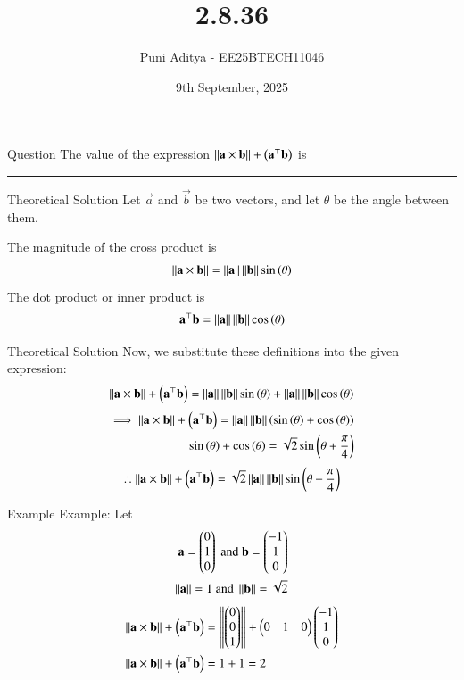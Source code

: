\documentclass{beamer}
\title{2.8.36}
\date{9th September, 2025}
\author{Puni Aditya - EE25BTECH11046}
\begin{document}
\frame{\titlepage}
\begin{frame}{Question}
The value of the expression $\left\lVert\mathbf{a} \times \mathbf{b}\right\rVert + \left(\mathbf{a}^\top\mathbf{b}\right)$ is \rule{2cm}{0.4pt}
\end{frame}

\begin{frame}{Theoretical Solution}
Let $\vec{a}$ and $\vec{b}$ be two vectors, and let $\theta$ be the angle between them.

The magnitude of the cross product is
\begin{align}
    \left\lVert\mathbf{a} \times \mathbf{b}\right\rVert = \left\lVert\mathbf{a}\right\rVert \left\lVert\mathbf{b}\right\rVert \sin\left(\theta\right)
\end{align}
The dot product or inner product is
\begin{align}
    \mathbf{a}^\top\mathbf{b} = \left\lVert\mathbf{a}\right\rVert \left\lVert\mathbf{b}\right\rVert \cos\left(\theta\right)
\end{align}
\end{frame}

\begin{frame}{Theoretical Solution}
Now, we substitute these definitions into the given expression:
\begin{align}
    \left\lVert\mathbf{a} \times \mathbf{b}\right\rVert + \left(\mathbf{a}^\top\mathbf{b}\right) = \left\lVert\mathbf{a}\right\rVert \left\lVert\mathbf{b}\right\rVert \sin\left(\theta\right) + \left\lVert\mathbf{a}\right\rVert \left\lVert\mathbf{b}\right\rVert \cos\left(\theta\right)
\end{align}
\begin{align}
\implies \left\lVert\mathbf{a} \times \mathbf{b}\right\rVert + \left(\mathbf{a}^\top\mathbf{b}\right) = \left\lVert\mathbf{a}\right\rVert \left\lVert\mathbf{b}\right\rVert \left(\sin\left(\theta\right) + \cos\left(\theta\right)\right) \\
\sin\left(\theta\right) + \cos\left(\theta\right) = \sqrt{2}\sin\left(\theta + \frac{\pi}{4}\right)
\end{align}
\begin{align*}
\therefore \left\lVert\mathbf{a} \times \mathbf{b}\right\rVert + \left(\mathbf{a}^\top\mathbf{b}\right) = \sqrt{2} \left\lVert\mathbf{a}\right\rVert \left\lVert\mathbf{b}\right\rVert \sin\left(\theta + \frac{\pi}{4}\right)
\end{align*}
\end{frame}

\begin{frame}{Example}
Example: Let
\begin{align*}
    \mathbf{a}=\begin{pmatrix}0 \\ 1 \\ 0\end{pmatrix}\text{ and }\mathbf{b}=\begin{pmatrix}-1 \\ 1 \\ 0\end{pmatrix} \\
    \left\lVert\mathbf{a}\right\rVert = 1\text{ and }\left\lVert\mathbf{b}\right\rVert = \sqrt{2} \\
\end{align*}
\begin{align}
    \left\lVert\mathbf{a} \times \mathbf{b}\right\rVert + \left(\mathbf{a}^\top\mathbf{b}\right) &= \left\lVert\begin{pmatrix}0 \\ 0 \\ 1\end{pmatrix}\right\rVert + \begin{pmatrix}0 & 1 &  0\end{pmatrix} \begin{pmatrix}-1 \\ 1 \\ 0\end{pmatrix} \\
    \left\lVert\mathbf{a} \times \mathbf{b}\right\rVert + \left(\mathbf{a}^\top\mathbf{b}\right) &= 1 + 1 = 2 \label{eq:2}
\end{align}
\end{frame}
\end{document}
